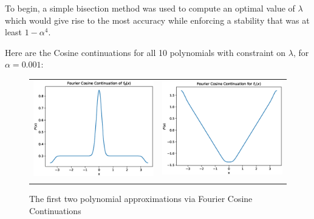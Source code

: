 \documentclass[11pt]{amsart}
\begin{document}
To begin, a simple bisection method was used to compute an optimal value of $\lambda$ which would give rise to the most accuracy while enforcing a stability that was at least $1-\alpha^4$.  

Here are the Cosine continuations for all 10 polynomials with constraint on $\lambda$, for $\alpha =0.001$:  
\begin{figure}[h!]
\centering
\begin{tabular}{|c|c|}
\hline
\includegraphics[scale=.5]{f_0Cosine.eps}
 \label{fig:Fig2}
&
\includegraphics[scale=.5]{f_1Cosine.eps}
\label{fig:Fig3}
\\ \\
\hline


\end{tabular}
\caption{The first two polynomial approximations via Fourier Cosine Continuations}
\end{figure}
\end{document}
